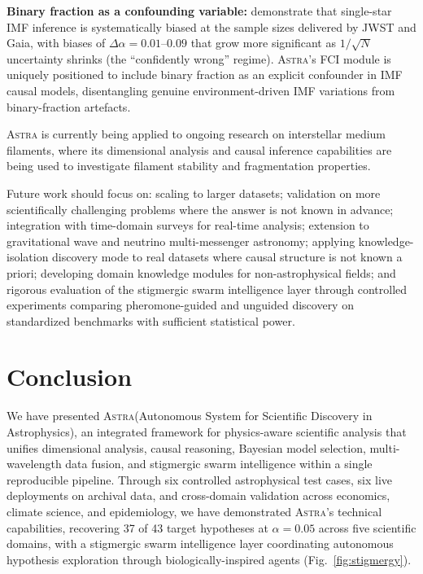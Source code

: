 \documentclass[usenatbib]{rasti}
\newcommand{\astra}{\textsc{Astra}\xspace}
\begin{document}
\begin{description}
  \item \textbf{Binary fraction as a confounding variable:} \citet{Rosen2026} demonstrate that single-star IMF inference is systematically biased at the sample sizes delivered by JWST and Gaia, with biases of $\Delta\alpha = 0.01$--$0.09$ that grow more significant as $1/\sqrt{N}$ uncertainty shrinks (the ``confidently wrong'' regime). \astra's FCI module is uniquely positioned to include binary fraction as an explicit confounder in IMF causal models, disentangling genuine environment-driven IMF variations from binary-fraction artefacts.
\end{description}

\astra is currently being applied to ongoing research on interstellar medium filaments, where its dimensional analysis and causal inference capabilities are being used to investigate filament stability and fragmentation properties.

Future work should focus on: scaling to larger datasets; validation on more scientifically challenging problems where the answer is not known in advance; integration with time-domain surveys for real-time analysis; extension to gravitational wave and neutrino multi-messenger astronomy; applying knowledge-isolation discovery mode to real datasets where causal structure is not known a priori; developing domain knowledge modules for non-astrophysical fields; and rigorous evaluation of the stigmergic swarm intelligence layer through controlled experiments comparing pheromone-guided and unguided discovery on standardized benchmarks with sufficient statistical power.

\section{Conclusion}
\label{sec:conclusion}

We have presented \astra (Autonomous System for Scientific Discovery in Astrophysics), an integrated framework for physics-aware scientific analysis that unifies dimensional analysis, causal reasoning, Bayesian model selection, multi-wavelength data fusion, and stigmergic swarm intelligence within a single reproducible pipeline.
Through six controlled astrophysical test cases, six live deployments on archival data, and cross-domain validation across economics, climate science, and epidemiology, we have demonstrated \astra's technical capabilities, recovering 37 of 43 target hypotheses at $\alpha = 0.05$ across five scientific domains, with a stigmergic swarm intelligence layer coordinating autonomous hypothesis exploration through biologically-inspired agents (Fig.~\ref{fig:stigmergy}).
\end{document}

